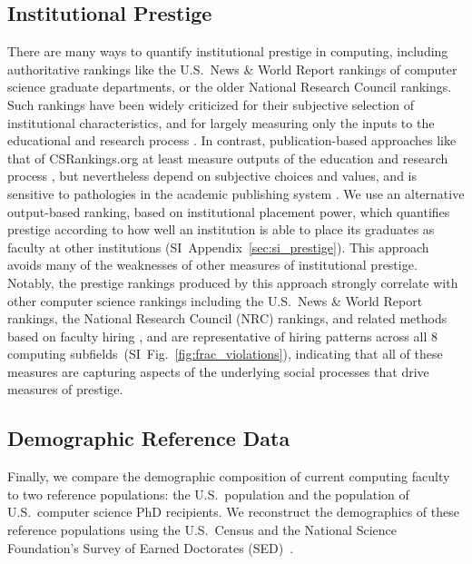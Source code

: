 \documentclass[reprint, twocolumn, aps, nofootinbib, superscriptaddress, longbibliography]{revtex4-1}
\begin{document}
\subsection{Institutional Prestige} 
There are many ways to quantify institutional prestige in computing, including authoritative rankings like the U.S.~News \& World Report rankings of computer science graduate departments, or the older National Research Council rankings. Such rankings have been widely criticized for their subjective selection of institutional characteristics, and for largely measuring only the inputs to the educational and research process \cite{bastedo2011how, sanoff2007us}. In contrast, publication-based approaches like that of CSRankings.org at least measure outputs of the education and research process \cite{csrankings2021}, but nevertheless depend on subjective choices and values, and is sensitive to pathologies in the academic publishing system \cite{parhami2016low, biagioli2018quality, fire2019over}. We use an alternative output-based ranking, based on institutional placement power, which quantifies prestige according to how well an institution is able to place its graduates as faculty at other institutions \cite{de2018physical} (SI~Appendix~\ref{sec:si_prestige}). This approach avoids many of the weaknesses of other measures of institutional prestige. Notably, the prestige rankings produced by this approach strongly correlate with other computer science rankings including the U.S.~News \& World Report rankings, the National Research Council (NRC) rankings, and related methods based on faculty hiring \cite{de2018physical, clauset2015systematic}, and are representative of hiring patterns across all 8 computing subfields~(SI~Fig.~\ref{fig:frac_violations}), indicating that all of these measures are capturing aspects of the underlying social processes that drive measures of prestige. 


\subsection{Demographic Reference Data} 

Finally, we compare the demographic composition of current computing faculty to two reference populations: the U.S.~population and the population of U.S.~computer science PhD recipients. We reconstruct the demographics of these reference populations using the U.S.~Census \cite{gibson2002historical, humes2011overview, hobbs2002demographic, howden2011age, census2019quick} and the National Science Foundation's Survey of Earned Doctorates (SED)~\cite{sed2020national}. 
\end{document}
